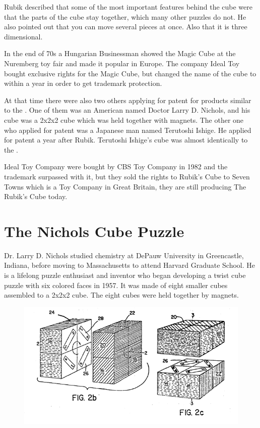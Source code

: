 Rubik described that some of the most important features behind the cube were that the parts of the cube stay together, which many other puzzles do not. He also pointed out that you can move several pieces at once. Also that it is three dimensional. 

In the end of 70s a Hungarian Businessman showed the Magic Cube at the Nuremberg toy fair and made it popular in Europe. The company Ideal Toy bought exclusive rights for the Magic Cube, but changed the name of the cube to \rubik{} within a year in order to get trademark protection.

At that time there were also two others applying for patent for products similar to the \rubik{}.  One of them was an American named Doctor Larry D. Nichols, and his cube was a 2x2x2 cube which was held together with magnets. The other one who applied for patent was a Japanese man named Terutoshi Ishige. He applied for patent a year after Rubik. Terutoshi Ishige's cube was almost identically to the \rubik{}.

Ideal Toy Company were bought by CBS Toy Company in 1982 and the trademark surpassed with it, but they sold the rights to Rubik's Cube to Seven Towns which is a Toy Company in Great Britain, they are still producing The Rubik's Cube today.
\section{The Nichols Cube Puzzle}
Dr. Larry D. Nichols studied chemistry at DePauw University in Greencastle, Indiana, before moving to Massachusetts to attend Harvard Graduate School. 
He is a lifelong puzzle enthusiast and inventor who  began developing a twist cube puzzle with six colored faces in 1957. It was made of eight smaller cubes assembled to a 2x2x2 cube. The eight cubes were held together by magnets.

\begin{figure}[H]
\begin{center}
\includegraphics[scale=0.8]{input/pics/Nicholspatent2.png}
\caption{}
\label{fig:Nicholspatent}
\end{center}
\end{figure}

